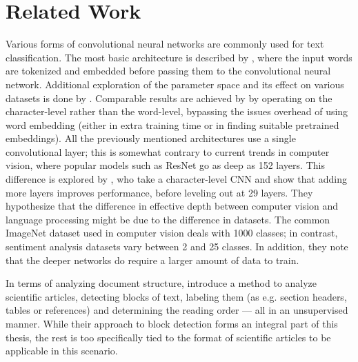 \section{Related Work}

Various forms of convolutional neural networks are commonly used for text
classification. The most basic architecture is described by
\textcite{kim2014conv}, where the input words are tokenized and embedded before
passing them to the convolutional neural network. Additional exploration of the
parameter space and its effect on various datasets is done by
\textcite{zhang2015conv}. Comparable results are achieved by
\textcite{zhang2015character} by operating on the character-level rather than
the word-level, bypassing the issues overhead of using word embedding (either in
extra training time or in finding suitable pretrained embeddings). All the
previously mentioned architectures use a single convolutional layer; this is
somewhat contrary to current trends in computer vision, where popular models
such as ResNet\citep{resnet2015} go as deep as 152 layers. This difference is
explored by \textcite{Conneau2016ldeep}, who take a character-level CNN and show
that adding more layers improves performance, before leveling out at 29 layers.
They hypothesize that the difference in effective depth between computer vision
and language processing might be due to the difference in datasets. The common
ImageNet dataset used in computer vision deals with 1000 classes; in contrast,
sentiment analysis datasets vary between 2 and 25 classes. In addition, they
note that the deeper networks do require a larger amount of data to train.

In terms of analyzing document structure, \textcite{klampfl2014unsupervised}
introduce a method to analyze scientific articles, detecting blocks of text,
labeling them (as e.g. section headers, tables or references) and determining
the reading order --- all in an unsupervised manner. While their approach to
block detection forms an integral part of this thesis, the rest is too
specifically tied to the format of scientific articles to be applicable in this
scenario.

